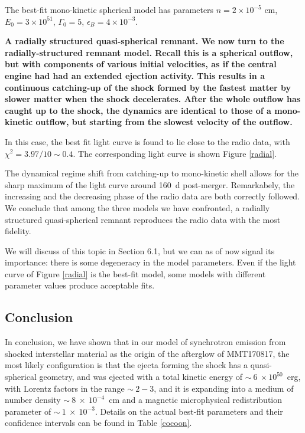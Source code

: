 The best-fit mono-kinetic spherical model has parameters $n = 2 \times 10^{-5}$ cm, $E_0 = 3 \times 10^51$, $\Gamma_0 = 5$, $\epsilon_B = 4 \times 10^{-3}$.

\bf{A radially structured quasi-spherical remnant. }We now turn to the radially-structured remnant model. Recall this is a spherical outflow, but with components of various initial velocities, as if the central engine had had an extended ejection activity. This results in a continuous catching-up of the shock formed by the fastest matter by slower matter when the shock decelerates. After the whole outflow has caught up to the shock, the dynamics are identical to those of a mono-kinetic outflow, but starting from the slowest velocity of the outflow.

In this case, the best fit light curve is found to lie close to the radio data, with $\chi^2 = 3.97/10 \sim 0.4$. The corresponding light curve is shown Figure \ref{radial}.


The dynamical regime shift from catching-up to mono-kinetic shell allows for the sharp maximum of the light curve around 160~d post-merger. Remarkabely, the increasing and the decreasing phase of the radio data are both correctly followed. We conclude that among the three models we have confronted, a radially structured quasi-spherical remnant reproduces the radio data with the most fidelity.

We will discuss of this topic in Section 6.1, but we can as of now signal its importance: there is some degeneracy in the model parameters. Even if the light curve of Figure \ref{radial} is the best-fit model, some models with different parameter values produce acceptable fits.


\subsection{Conclusion}

In conclusion, we have shown that in our model of synchrotron emission from shocked interstellar material as the origin of the afterglow of MMT170817, the most likely configuration is that the ejecta forming the shock has a quasi-spherical geometry, and was ejected with a total kinetic energy of $\sim~6~\times 10^{50}$~erg, with Lorentz factors in the range $\sim~2-3$, and it is expanding into a medium of number density $\sim~8~\times~10^{-4}$~cm and a magnetic microphysical redistribution parameter of $\sim~1~\times~10^{-3}$. Details on the actual best-fit parameters and their confidence intervals can be found in Table \ref{cocoon}.

